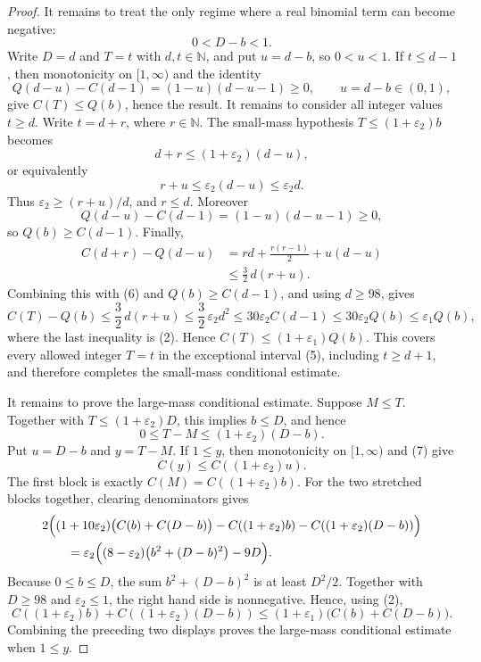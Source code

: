 \begin{proof}
It remains to treat the only regime where a real binomial term can become
negative:
\[
0<D-b<1. \tag{5}
\]
Write \(D=d\) and \(T=t\) with \(d,t\in\mathbb N\), and put
\(u=d-b\), so \(0<u<1\).  If \(t\le d-1\), then monotonicity on
\([1,\infty)\) and the identity
\[
Q(d-u)-C(d-1)=(1-u)(d-u-1)\ge0,
\qquad u=d-b\in(0,1),
\]
give \(C(T)\le Q(b)\), hence the result.  It remains to consider all
integer values \(t\ge d\).  Write \(t=d+r\), where \(r\in\mathbb N\).  The
small-mass hypothesis \(T\le(1+\varepsilon_2)b\) becomes
\[
d+r\le(1+\varepsilon_2)(d-u),
\]
or equivalently
\[
r+u\le\varepsilon_2(d-u)\le\varepsilon_2d. \tag{6}
\]
Thus \(\varepsilon_2\ge(r+u)/d\), and \(r\le d\).  Moreover
\[
Q(d-u)-C(d-1)=(1-u)(d-u-1)\ge0,
\]
so \(Q(b)\ge C(d-1)\).  Finally,
\[
\begin{aligned}
C(d+r)-Q(d-u)
&= rd+\frac{r(r-1)}2+u(d-u)  \\
&\le \frac32\,d(r+u).
\end{aligned}
\]
Combining this with (6) and \(Q(b)\ge C(d-1)\), and using \(d\ge98\), gives
\[
C(T)-Q(b)
\le \frac32\,d(r+u)
\le \frac32\,\varepsilon_2 d^2
\le 30\varepsilon_2 C(d-1)
\le 30\varepsilon_2 Q(b)
\le \varepsilon_1 Q(b),
\]
where the last inequality is (2).  Hence
\(C(T)\le(1+\varepsilon_1)Q(b)\).  This covers every allowed integer
\(T=t\) in the exceptional interval (5), including \(t\ge d+1\), and
therefore completes the small-mass conditional estimate.

It remains to prove the large-mass conditional estimate.  Suppose \(M\le T\).
Together with \(T\le(1+\varepsilon_2)D\), this implies \(b\le D\), and hence
\[
0\le T-M\le(1+\varepsilon_2)(D-b). \tag{7}
\]
Put \(u=D-b\) and \(y=T-M\).  If \(1\le y\), then monotonicity on
\([1,\infty)\) and (7) give
\[
C(y)\le C((1+\varepsilon_2)u).
\]
The first block is exactly \(C(M)=C((1+\varepsilon_2)b)\).  For the two
stretched blocks together, clearing denominators gives
\[
\begin{aligned}
&2\Bigl((1+10\varepsilon_2)\bigl(C(b)+C(D-b)\bigr)
  -C((1+\varepsilon_2)b)
  -C((1+\varepsilon_2)(D-b))\Bigr)  \\
&\qquad =
\varepsilon_2\Bigl((8-\varepsilon_2)
  \bigl(b^2+(D-b)^2\bigr)-9D\Bigr).
\end{aligned}
\]
Because \(0\le b\le D\), the sum \(b^2+(D-b)^2\) is at least \(D^2/2\).
Together with \(D\ge98\) and \(\varepsilon_2\le1\), the right hand side is
nonnegative.  Hence, using (2),
\[
C((1+\varepsilon_2)b)+C((1+\varepsilon_2)(D-b))
\le
(1+\varepsilon_1)\bigl(C(b)+C(D-b)\bigr).
\]
Combining the preceding two displays proves the large-mass conditional
estimate when \(1\le y\).


\end{proof}

